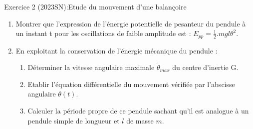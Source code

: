\documentclass[12pt, french]{article}
\begin{document}
\begin{Box2}{Exercice 2 (2023SN):Etude du mouvement d’une balançoire }
\begin{enumerate}
  \item Montrer que l’expression de l’énergie potentielle de pesanteur du pendule à un instant t pour les
    oscillations de faible amplitude est : $E_{pp} = \frac{1}{2}.mgl\theta^2$.
  \item En exploitant la conservation de l’énergie mécanique du pendule :
  \begin{enumerate}
    \item Déterminer la vitesse angulaire maximale $\dot{\theta}_{max}$ du centre d’inertie G.
    \item Etablir l’équation différentielle du mouvement vérifiée par l’abscisse angulaire $\theta(t)$.
    \item Calculer la période propre de ce pendule sachant qu’il est analogue à un pendule simple de
longueur et $l$ de masse $m$.
  \end{enumerate}
\end{enumerate}

\end{Box2}
\end{document}

